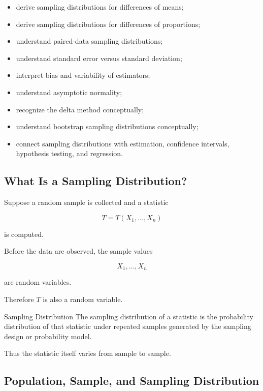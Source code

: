 {\begin{itemize}
          chi-square variables;
    \item derive sampling distributions for differences of means;
    \item derive sampling distributions for differences of proportions;
    \item understand paired-data sampling distributions;
    \item understand standard error versus standard deviation;
    \item interpret bias and variability of estimators;
    \item understand asymptotic normality;
    \item recognize the delta method conceptually;
    \item understand bootstrap sampling distributions conceptually;
    \item connect sampling distributions with estimation, confidence
          intervals, hypothesis testing, and regression.
\end{itemize}
}

\subsection{What Is a Sampling Distribution?}
\label{subsec:what-is-sampling-distribution}

Suppose a random sample is collected and a statistic

\[
T
=
T(X_1,\ldots,X_n)
\]

is computed.

Before the data are observed, the sample values

\[
X_1,\ldots,X_n
\]

are random variables.

Therefore \(T\) is also a random variable.

\begin{definitionbox}{Sampling Distribution}
The sampling distribution of a statistic is the probability distribution
of that statistic under repeated samples generated by the sampling
design or probability model.
\end{definitionbox}

Thus the statistic itself varies from sample to sample.

\subsection{Population, Sample, and Sampling Distribution}
\label{subsec:population-sample-sampling-distribution}

